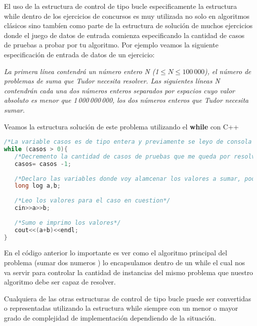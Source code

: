 El uso de la estructura de control de tipo bucle especificamente la estructura while dentro de los ejercicios de concursos es muy utilizada no solo en algoritmos clásicos sino tambíen como parte de la estructura de solución de muchos ejercicios donde el juego de datos de entrada comienza especificando la cantidad de casos de pruebas a probar por tu algoritmo. Por ejemplo veamos la siguiente especificación de entrada de datos de un ejercicio:

\emph{La primera línea contendrá un número entero N (1$\leq N \leq 100\,000$), el número de problemas de suma que Tudor necesita resolver. Las siguientes líneas N contendrán cada una dos números enteros separados por espacios cuyo valor absoluto es menor que 1\,000\,000\,000, los dos números enteros que Tudor necesita sumar.}

Veamos la estructura solución de este problema utilizando el \textbf{while} con C++

\begin{lstlisting}[language=C++]
/*La variable casos es de tipo entera y previamente se leyo de consola su valor y almacena el valor de la cantidad de casos a probar*/
while (casos > 0){
   /*Decremento la cantidad de casos de pruebas que me queda por resolver*/
   casos= casos -1;
   
   /*Declaro las variables donde voy alamcenar los valores a sumar, podria poner esta linea arriba del while sin porblema y me ahorarria memoria*/
   long log a,b;
   
   /*Leo los valores para el caso en cuestion*/    
   cin>>a>>b; 
   
   /*Sumo e imprimo los valores*/
   cout<<(a+b)<<endl;
}
\end{lstlisting}

En el código anterior lo importante es ver como el algoritmo principal del problema (sumar dos numeros ) lo encapsulamos dentro de un while el cual nos va servir para controlar la cantidad de instancias del mismo problema que nuestro algoritmo debe ser capaz de resolver. 

Cualquiera de las otras estructuras de control de tipo bucle puede ser convertidas o representadas utilizando la estructura while siempre con un menor o mayor grado de complejidad de implementación dependiendo de la situación. 